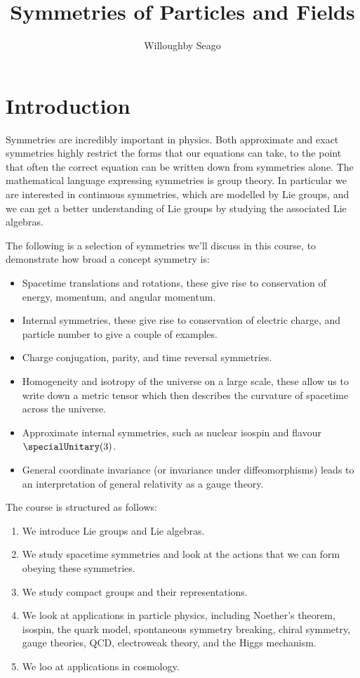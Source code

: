 \documentclass[fleqn]{NotesClass}
\title{Symmetries of Particles and Fields}
\author{Willoughby Seago}
\date{}
\begin{document}
    \frontmatter
    \titlepage
    \innertitlepage{}
    \tableofcontents
    \mainmatter
    
    \chapter{Introduction}
    Symmetries are incredibly important in physics.
    Both approximate and exact symmetries highly restrict the forms that our equations can take, to the point that often the correct equation can be written down from symmetries alone.
    The mathematical language expressing symmetries is group theory.
    In particular we are interested in continuous symmetries, which are modelled by Lie groups, and we can get a better understanding of Lie groups by studying the associated Lie algebras.
    
    The following is a selection of symmetries we'll discuss in this course, to demonstrate how broad a concept symmetry is:
    \begin{itemize}
        \item Spacetime translations and rotations, these give rise to conservation of energy, momentum, and angular momentum.
        \item Internal symmetries, these give rise to conservation of electric charge, and particle number to give a couple of examples.
        \item Charge conjugation, parity, and time reversal symmetries.
        \item Homogeneity and isotropy of the universe on a large scale, these allow us to write down a metric tensor which then describes the curvature of spacetime across the universe.
        \item Approximate internal symmetries, such as nuclear isospin and flavour \(\specialUnitary(3)\).
        \item General coordinate invariance (or invariance under diffeomorphisms) leads to an interpretation of general relativity as a gauge theory.
    \end{itemize}
    
    The course is structured as follows:
    \begin{enumerate}
        \item We introduce Lie groups and Lie algebras.
        \item We study spacetime symmetries and look at the actions that we can form obeying these symmetries.
        \item We study compact groups and their representations.
        \item We look at applications in particle physics, including Noether's theorem, isospin, the quark model, spontaneous symmetry breaking, chiral symmetry, gauge theories, QCD, electroweak theory, and the Higgs mechanism.
        \item We loo at applications in cosmology.
    \end{enumerate}
    
\end{document}
